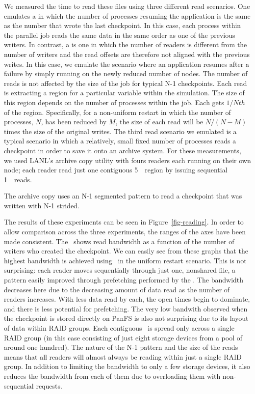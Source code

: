 We measured the time to read these files using three different read
scenarios. One emulates a  in which the number of
processes resuming the application is the same as the number that wrote the
last checkpoint. In this case, each process within the parallel job reads the
same data in the same order as one of the previous writers. In
contrast, a  is one in which the number of
readers is different from the number of writers and the read offsets are
therefore not aligned with the previous writes. In this case, we emulate the
scenario where an application resumes after a failure by simply running on the
newly reduced number of nodes. The number of reads is not affected by the size
of the job for typical N-1 checkpoints. Each read is extracting a region for a
particular variable within the simulation. The size of this region depends on
the number of processes within the job. Each gets $1/Nth$ of the region.
Specifically, for a non-uniform restart in which the number of processes, $N$,
has been reduced by $M$, the size of each read will be $N/(N-M)$ times the size
of the original writes. The third read scenario we emulated is a typical
scenario in which a relatively, small fixed number of processes reads a
checkpoint in order to save it onto an archive system. For these measurements,
we used LANL's archive copy utility with fours readers each running on their
own node; each reader read just one contiguous 5~\GB\ region by issuing 
sequential 1~\MB\ reads. 

The archive copy uses an N-1 segmented pattern to
read a checkpoint that was written with N-1 strided.
\fi

The results of these experiments can be seen in Figure~\ref{fig-reading}. In
order to allow comparison across the three experiments, the ranges of the axes
have been made consistent. The \yaxis\ shows read bandwidth as a function of
the number of writers who created the checkpoint. We can easily see from these
graphs that the highest bandwidth is achieved using \plfs\ in the uniform
restart scenario. This is not surprising: each reader moves sequentially
through just one, nonshared file, a pattern easily improved through prefetching
performed by the \upfs. The bandwidth decreases here due to the decreasing
amount of data read as the number of readers increases. With less data read by
each, the open times begin to dominate, and there is less potential for
prefetching. The very low bandwith observed when the checkpoint is stored
directly on PanFS is also not surprising due to its layout of data within RAID
groups. Each contiguous \GB\ is spread only across a single RAID group (in this
case consisting of just eight storage devices from a pool of around one
hundred). The nature of the N-1 pattern and the size of the reads means that
all readers will almost always be reading within just a single RAID group. In
addition to limiting the bandwidth to only a few storage devices, it also
reduces the bandwidth from each of them due to overloading them with
non-sequential requests.

